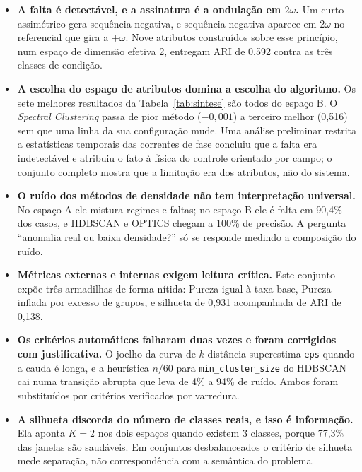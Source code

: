 \documentclass[12pt,a4paper]{article}
\begin{document}
\begin{itemize}
    \item \textbf{A falta é detectável, e a assinatura é a ondulação em $2\omega$.} Um curto assimétrico gera sequência negativa, e sequência negativa aparece em $2\omega$ no referencial que gira a $+\omega$. Nove atributos construídos sobre esse princípio, num espaço de dimensão efetiva 2, entregam ARI de 0,592 contra as três classes de condição.

    \item \textbf{A escolha do espaço de atributos domina a escolha do algoritmo.} Os sete melhores resultados da Tabela~\ref{tab:sintese} são todos do espaço B. O \emph{Spectral Clustering} passa de pior método ($-0{,}001$) a terceiro melhor (0,516) sem que uma linha da sua configuração mude. Uma análise preliminar restrita a estatísticas temporais das correntes de fase concluiu que a falta era indetectável e atribuiu o fato à física do controle orientado por campo; o conjunto completo mostra que a limitação era dos atributos, não do sistema.

    \item \textbf{O ruído dos métodos de densidade não tem interpretação universal.} No espaço A ele mistura regimes e faltas; no espaço B ele é falta em 90,4\% dos casos, e HDBSCAN e OPTICS chegam a 100\% de precisão. A pergunta ``anomalia real ou baixa densidade?'' só se responde medindo a composição do ruído.

    \item \textbf{Métricas externas e internas exigem leitura crítica.} Este conjunto expõe três armadilhas de forma nítida: Pureza igual à taxa base, Pureza inflada por excesso de grupos, e silhueta de 0,931 acompanhada de ARI de 0,138.

    \item \textbf{Os critérios automáticos falharam duas vezes e foram corrigidos com justificativa.} O joelho da curva de $k$-distância superestima \texttt{eps} quando a cauda é longa, e a heurística $n/60$ para \texttt{min\_cluster\_size} do HDBSCAN cai numa transição abrupta que leva de 4\% a 94\% de ruído. Ambos foram substituídos por critérios verificados por varredura.

    \item \textbf{A silhueta discorda do número de classes reais, e isso é informação.} Ela aponta $K=2$ nos dois espaços quando existem 3 classes, porque 77,3\% das janelas são saudáveis. Em conjuntos desbalanceados o critério de silhueta mede separação, não correspondência com a semântica do problema.
\end{itemize}
\end{document}
